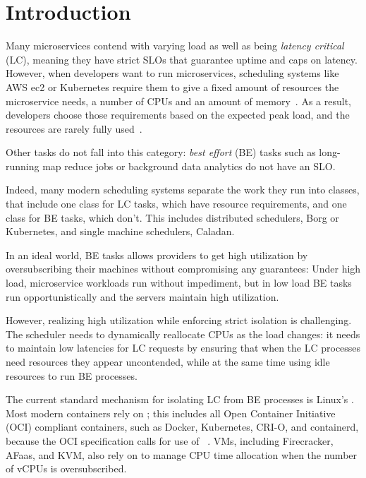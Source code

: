 \section{Introduction}
\label{s:intro}

Many microservices contend with varying load as well as being \textit{latency
critical} (LC), meaning they have strict SLOs that guarantee uptime and caps on
latency. However, when developers want to run microservices, scheduling systems
like AWS ec2 or Kubernetes require them to give a fixed amount of resources the
microservice needs, \ie{} a number of CPUs and an amount of
memory~\cite{aws-ec2-resources, kubernetes-resources}. As a result, developers
choose those requirements based on the expected peak load, and the resources are
rarely fully used~\cite{borg, nu, overprovision}.

Other tasks do not fall into this category: \textit{best effort} (BE) tasks such
as long-running map reduce jobs or background data analytics do not have an SLO.

Indeed, many modern scheduling systems separate the work they run into classes,
that include one class for LC tasks, which have resource requirements, and one
class for BE tasks, which don't. This includes distributed schedulers, \eg{}
Borg\cite{borg} or Kubernetes\cite{kubernetes-resources}, and single machine
schedulers, \eg{} Caladan\cite{caladan}.

In an ideal world, BE tasks allows providers to get high utilization by
oversubscribing their machines without compromising any guarantees: Under high
load, microservice workloads run without impediment, but in low load BE tasks
run opportunistically and the servers maintain high utilization.

However, realizing high utilization while enforcing strict isolation is
challenging. The scheduler needs to dynamically reallocate CPUs as the load
changes: it needs to maintain low latencies for LC requests by ensuring that
when the LC processes need resources they appear uncontended, while at the same
time using idle resources to run BE processes.

The current standard mechanism for isolating LC from BE processes is Linux's
\cgroups{}. Most modern containers rely on \cgroups{}; this includes all Open
Container Initiative (OCI) compliant containers, such as Docker, Kubernetes,
CRI-O, and containerd, because the OCI specification calls for use of
\cgroups{}~\cite{oci-cgroups,docker-docs-cgroups,container-isolation-article}.
VMs, including Firecracker, AFaas, and KVM, also rely on \cgroups{} to manage
CPU time allocation when the number of vCPUs is
oversubscribed.~\cite{kvm-cgroups, firecracker-cgroups,afaas}

